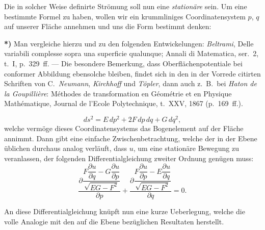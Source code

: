 \documentclass{article}
\begin{document}
Die in solcher Weise definirte Strömung soll nun eine \emph{stationäre} sein. Um eine bestimmte Formel zu haben, wollen wir ein krummliniges Coordinatensystem $p$, $q$ auf unserer Fläche annehmen und uns die Form bestimmt denken:

\textbf{*)} Man vergleiche hierzu und zu den folgenden Entwickelungen: \emph{Beltrami}, Delle variabili complesse sopra una superficie qualunque; Annali di Matematica, ser.~2, t.~I, p.~329~ff. --- Die besondere Bemerkung, dass Oberflächenpotentiale bei conformer Abbildung ebensolche bleiben, findet sich in den in der Vorrede citirten Schriften von C.\ \emph{Neumann}, \emph{Kirchhoff} und \emph{Töpler}, dann auch z.\ B.\ bei \emph{Haton de la Goupillière}: Méthodes de transformation en Géométrie et en Physique Mathématique, Journal de l'Ecole Polytechnique, t.~XXV, 1867 (p.~169~ff.).

\[ ds^{2} = E\,dp^{2} + 2F\,dp\,dq + G\,dq^{2}, \tag{1} \]
welche vermöge dieses Coordinatensystems das Bogenelement auf der Fläche annimmt. Dann gibt eine einfache Zwischenbetrachtung, welche der in der Ebene üblichen durchaus analog verläuft, dass $u$, um eine stationäre Bewegung zu veranlassen, der folgenden Differentialgleichung zweiter Ordnung genügen muss:
\[ \frac{\partial \dfrac{F\dfrac{\partial u}{\partial q} - G\dfrac{\partial u}{\partial p}}{\sqrt{EG - F^{2}}}}{\partial p} + \frac{\partial \dfrac{F\dfrac{\partial u}{\partial p} - E\dfrac{\partial u}{\partial q}}{\sqrt{EG - F^{2}}}}{\partial q} = 0. \tag{2} \]

An diese Differentialgleichung knüpft nun eine kurze Ueberlegung, welche die volle Analogie mit den auf die Ebene bezüglichen Resultaten herstellt.
\end{document}
